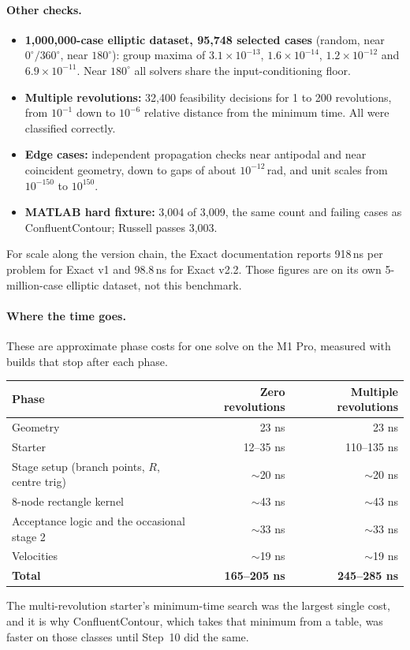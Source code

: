 \documentclass[11pt]{article}
\begin{document}
\paragraph{Other checks.}
\begin{itemize}
  \item \textbf{1,000,000-case elliptic dataset, 95,748 selected cases} (random, near $0^\circ/360^\circ$, near $180^\circ$): group maxima of $3.1\times10^{-13}$, $1.6\times10^{-14}$, $1.2\times10^{-12}$ and $6.9\times10^{-11}$. Near $180^\circ$ all solvers share the input-conditioning floor.
  \item \textbf{Multiple revolutions:} 32,400 feasibility decisions for 1 to 200 revolutions, from $10^{-1}$ down to $10^{-6}$ relative distance from the minimum time. All were classified correctly.
  \item \textbf{Edge cases:} independent propagation checks near antipodal and near coincident geometry, down to gaps of about $10^{-12}$\,rad, and unit scales from $10^{-150}$ to $10^{150}$.
  \item \textbf{MATLAB hard fixture:} 3,004 of 3,009, the same count and failing cases as ConfluentContour; Russell passes 3,003.
\end{itemize}
For scale along the version chain, the Exact documentation reports 918\,ns per problem for Exact v1 and 98.8\,ns for Exact v2.2. Those figures are on its own 5-million-case elliptic dataset, not this benchmark.

\paragraph{Where the time goes.} These are approximate phase costs for one solve on the M1 Pro, measured with builds that stop after each phase.
\begin{center}
\small
\begin{tabular}{l r r}
\toprule
Phase & Zero revolutions & Multiple revolutions \\
\midrule
Geometry & 23 ns & 23 ns \\
Starter & 12--35 ns & 110--135 ns \\
Stage setup (branch points, $R$, centre trig) & $\sim$20 ns & $\sim$20 ns \\
8-node rectangle kernel & $\sim$43 ns & $\sim$43 ns \\
Acceptance logic and the occasional stage 2 & $\sim$33 ns & $\sim$33 ns \\
Velocities & $\sim$19 ns & $\sim$19 ns \\
\midrule
\textbf{Total} & \textbf{165--205 ns} & \textbf{245--285 ns} \\
\bottomrule
\end{tabular}
\end{center}
The multi-revolution starter's minimum-time search was the largest single cost, and it is why ConfluentContour, which takes that minimum from a table, was faster on those classes until Step~10 did the same.
\end{document}
